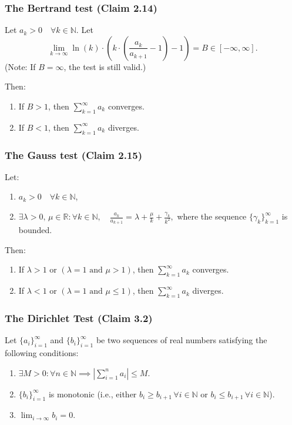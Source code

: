 \subsubsection{The Bertrand test (Claim 2.14)}


Let $a_k > 0 \quad \forall k \in \mathbb{N}$. Let
\[
    \lim_{k \to \infty} \ln(k) \cdot \left( k \cdot \left( \frac{a_k}{a_{k+1}} - 1 \right) - 1 \right) = B \in [-\infty, \infty].
\]
(Note: If $B = \infty$, the test is still valid.)

Then:
\begin{enumerate}[label=(\arabic*)]
    \item If $B > 1$, then $\sum_{k=1}^\infty a_k$ converges.
    \item If $B < 1$, then $\sum_{k=1}^\infty a_k$ diverges.
\end{enumerate}

\subsubsection{The Gauss test (Claim 2.15)}


Let:
\begin{enumerate}[label=(\alph*)]
    \item $a_k > 0 \quad \forall k \in \mathbb{N}$,
    \item $\exists \lambda > 0, \, \mu \in \mathbb{R} : \forall k \in \mathbb{N}, \quad
    \frac{a_k}{a_{k+1}} = \lambda + \frac{\mu}{k} + \frac{\gamma_k}{k^2},$
    where the sequence $\{\gamma_k\}_{k=1}^\infty$ is bounded.
\end{enumerate}

Then:
\begin{enumerate}[label=(\arabic*)]
    \item If $\lambda > 1$ or $(\lambda = 1 \text{ and } \mu > 1)$, then $\sum_{k=1}^\infty a_k$ converges.
    \item If $\lambda < 1$ or $(\lambda = 1 \text{ and } \mu \leq 1)$, then $\sum_{k=1}^\infty a_k$ diverges.
\end{enumerate}

\subsubsection{The Dirichlet Test (Claim 3.2)}


Let $\{a_i\}_{i=1}^\infty$ and $\{b_i\}_{i=1}^\infty$ be two sequences of real numbers satisfying the following conditions:
\begin{enumerate}[label=(\alph*)]
    \item $\exists M > 0 : \forall n \in \mathbb{N} \implies \left| \sum_{i=1}^n a_i \right| \leq M$.
    \item $\{b_i\}_{i=1}^\infty$ is monotonic
    (i.e., either $b_i \geq b_{i+1} \, \forall i \in \mathbb{N}$ or $b_i \leq b_{i+1} \, \forall i \in \mathbb{N}$).
    \item $\lim_{i \to \infty} b_i = 0$.
\end{enumerate}

